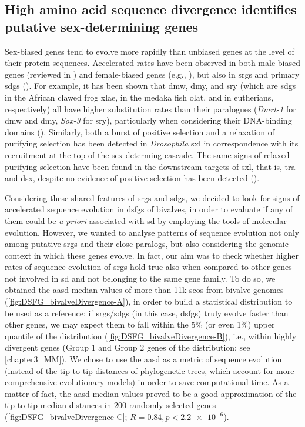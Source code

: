 \subsection{High amino acid sequence divergence identifies putative sex-determining genes}
Sex-biased genes tend to evolve more rapidly than unbiased genes at the level of their protein sequences. Accelerated rates have been observed in both male-biased genes (reviewed in ) and female-biased genes (e.g., ), but also in \glspl{srg} and primary \glspl{sdg} (). For example, it has been shown that \gls{dmw}, \gls{dmy}, and \gls{sry} (which are \glspl{sdg} in the African clawed frog \gls{xlae}, in the medaka fish \gls{olat}, and in eutherians, respectively) all have higher substitution rates than their paralogues (\textit{Dmrt-1} for \gls{dmw} and \gls{dmy}, \textit{Sox-3} for \gls{sry}), particularly when considering their DNA-binding domains (). Similarly, both a burst of positive selection and a relaxation of purifying selection has been detected in \textit{Drosophila} \gls{sxl} in correspondence with its recruitment at the top of the sex-determing cascade. The same signs of relaxed purifying selection have been found in the downstream targets of \gls{sxl}, that is, \gls{tra} and \gls{dsx}, despite no evidence of positive selection has been detected ().

Considering these shared features of \glspl{srg} and \glspl{sdg}, we decided to look for signs of accelerated sequence evolution in \glspl{dsfg} of bivalves, in order to evaluate if any of them could be \textit{a-priori} associated with \gls{sd} by employing the tools of molecular evolution. However, we wanted to analyse patterns of sequence evolution not only among putative \glspl{srg} and their close paralogs, but also considering the genomic context in which these genes evolve. In fact, our aim was to check whether higher rates of sequence evolution of \glspl{srg} hold true also when compared to other genes not involved in \gls{sd} and not belonging to the same gene family. To do so, we obtained the \gls{aasd} median values of more than 11k \glspl{sco} from bivalve genomes (\cref{fig:DSFG_bivalveDivergence-A}), in order to build a statistical distribution to be used as a reference: if \glspl{srg}/\glspl{sdg} (in this case, \glspl{dsfg}) truly evolve faster than other genes, we may expect them to fall within the 5\% (or even 1\%) upper quantile of the distribution (\cref{fig:DSFG_bivalveDivergence-B}), i.e., within highly divergent genes (Group 1 and Group 2 genes of the distribution; see \cref{chapter3_MM}). We chose to use the \gls{aasd} as a metric of sequence evolution (instead of the tip-to-tip distances of phylogenetic trees, which account for more comprehensive evolutionary models) in order to save computational time. As a matter of fact, the \gls{aasd} median values proved to be a good approximation of the tip-to-tip median distances in 200 randomly-selected genes (\cref{fig:DSFG_bivalveDivergence-C}; $R = 0.84, p < \num{2.2e-6}$).

